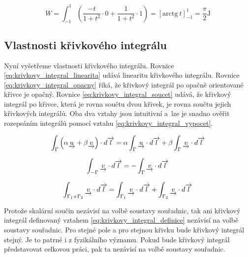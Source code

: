 \[
W = \int_{-1}^1 \left (\frac{-t}{1 + t^2} \cdot 0 + \frac{1}{1 + t^2} \cdot 1 \right) = \left[\mathrm{arctg} \ t\right]_{-1}^1 = \frac{\pi}{2} \mathrm{J}
\]

\subsection{Vlastnosti křivkového integrálu}

Nyní vyšetřeme vlastnosti křivkového integrálu. Rovnice \eqref{eq:krivkovy_integral_linearita} udává linearitu křivkového integrálu. Rovnice \eqref{eq:krivkovy_integral_opacny} říká, že křivkový integrál po opačně orientované křivce je opačný. Rovnice \eqref{eq:krivkovy_integral_soucet} udává, že křivkový integrál po křivce, která je rovna součtu dvou křivek, je rovna součtu jejich křivkových integrálů. Oba dva vztahy jsou intuitivní a~lze je snadno ověřit rozepsáním integrálů pomocí vztahu \eqref{eq:krivkovy_integral_vypocet}.

\begin{equation}
\label{eq:krivkovy_integral_linearita}
\begin{split}
\int_{\Gamma} \left(\alpha \underrightarrow{u} + \beta \underrightarrow{v}\right) \cdot d\overrightarrow{l} = \alpha \int_{\Gamma} \underrightarrow{u} \cdot d\overrightarrow{l} + \beta \int_{\Gamma} \underrightarrow{v} \cdot d\overrightarrow{l}
\end{split}
\end{equation}

\begin{equation}
\label{eq:krivkovy_integral_opacny}
\begin{split}
\int_{-\Gamma} \underrightarrow{v} \cdot d\overrightarrow{l} = -\int_{\Gamma} \underrightarrow{v} \cdot d\overrightarrow{l}
\end{split}
\end{equation}

\begin{equation}
\label{eq:krivkovy_integral_soucet}
\begin{split}
\int_{\Gamma_1 + \Gamma_2} \underrightarrow{v} \cdot d\overrightarrow{l} = \int_{\Gamma_1} \underrightarrow{v} \cdot d\overrightarrow{l} + \int_{\Gamma_2} \underrightarrow{v} \cdot d\overrightarrow{l}
\end{split}
\end{equation}

Protože skalární součin nezávisí na volbě soustavy souřadnic, tak ani křivkový integrál definovaný vztahem \eqref{eq:krivkovy_integral_definice} nezávisí na volbě soustavy souřadnic. Pro stejné pole a pro stejnou křivku bude křivkový integrál stejný. Je to patrné i z fyzikálního významu. Pokud bude křivkový integrál představovat celkovou práci, pak ta nezávisí na volbě soustavy souřadnic.

